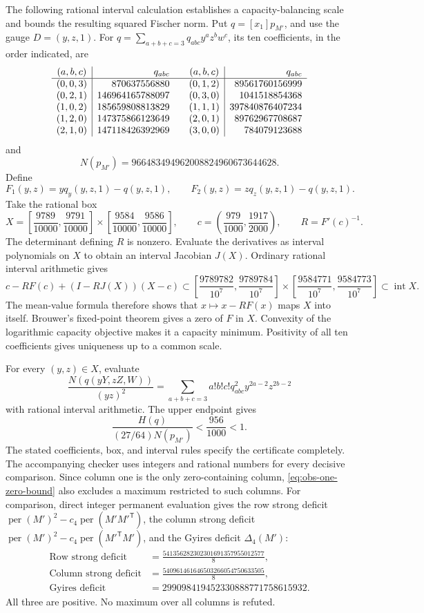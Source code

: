\documentclass[11pt,a4paper]{article}
\theoremstyle{definition}
\theoremstyle{remark}
\newcommand{\per}{\operatorname{per}}
\newcommand{\T}{\mathsf{T}}
\begin{document}
The following rational interval calculation establishes a capacity-balancing scale and bounds the resulting squared Fischer norm.
Put $q=[x_1]p_{M'}$, and use the gauge $D=(y,z,1)$.
For $q=\sum_{a+b+c=3}q_{abc}y^az^bw^c$, its ten coefficients, in the
order indicated, are
\[
\begin{array}{c|r@{\qquad}c|r}
(a,b,c)&q_{abc}&(a,b,c)&q_{abc}\\\hline
(0,0,3)&870637556880&(0,1,2)&89561760156999\\
(0,2,1)&146964165788097&(0,3,0)&1041518854368\\
(1,0,2)&185659808813829&(1,1,1)&397840876407234\\
(1,2,0)&147375866123649&(2,0,1)&89762967708687\\
(2,1,0)&147118426392969&(3,0,0)&784079123688
\end{array}
\]
and
\[
 N(p_{M'})=966483494962008824960673644628.
\]
Define
\[
 F_1(y,z)=yq_y(y,z,1)-q(y,z,1),\qquad
 F_2(y,z)=zq_z(y,z,1)-q(y,z,1).
\]
Take the rational box
\[
 X=\left[\frac{9789}{10000},\frac{9791}{10000}\right]
 \times\left[\frac{9584}{10000},\frac{9586}{10000}\right],\qquad
 c=\left(\frac{979}{1000},\frac{1917}{2000}\right),
 \qquad R=F'(c)^{-1}.
\]
The determinant defining $R$ is nonzero.
Evaluate the derivatives as interval polynomials on $X$ to obtain an
interval Jacobian $J(X)$.
Ordinary rational interval arithmetic gives
\[
 c-RF(c)+(I-RJ(X))(X-c)
 \subset
 \left[\frac{9789782}{10^7},\frac{9789784}{10^7}\right]
 \times
 \left[\frac{9584771}{10^7},\frac{9584773}{10^7}\right]
 \subset\operatorname{int}X.
\]
The mean-value formula therefore shows that $x\mapsto x-RF(x)$ maps $X$
into itself. Brouwer's fixed-point theorem gives a zero of $F$ in $X$.
Convexity of the logarithmic capacity objective makes it a capacity
minimum. Positivity of all ten coefficients gives uniqueness up to a
common scale.

For every $(y,z)\in X$, evaluate
\[
 \frac{N(q(yY,zZ,W))}{(yz)^2}
 =\sum_{a+b+c=3}a!b!c!q_{abc}^2y^{2a-2}z^{2b-2}
\]
with rational interval arithmetic.
The upper endpoint gives
\begin{equation}\label{eq:obs-one-zero-bound}
 \frac{H(q)}{(27/64)N(p_{M'})}<\frac{956}{1000}<1.
\end{equation}
The stated coefficients, box, and interval rules specify the certificate
completely. The accompanying checker uses integers and rational numbers
for every decisive comparison.
Since column one is the only zero-containing column,
\eqref{eq:obs-one-zero-bound} also excludes a maximum restricted to such
columns.
For comparison, direct integer permanent evaluation gives the row strong deficit
$\per(M')^2-c_4\per(M'M'^\T)$, the column strong deficit
$\per(M')^2-c_4\per(M'^\T M')$, and the Gyires deficit $\Delta_4(M')$:
\[
 \begin{aligned}
 \text{Row strong deficit}&=\frac{541356282302301691357955012577}{8},\\
 \text{Column strong deficit}&=\frac{540961461646503266054750633505}{8},\\
 \text{Gyires deficit}&=299098419452330888771758615932.
 \end{aligned}
\]
All three are positive. No maximum over all columns is refuted.
\end{document}
